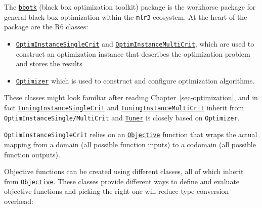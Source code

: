 The
\href{https://bbotk.mlr-org.com}{\texttt{bbotk}}
(black box optimization toolkit) package is the workhorse package for
general black box optimization within the \texttt{mlr3} ecosystem. At
the heart of the package are the R6 classes:

\begin{itemize}
\tightlist
\item
  \href{https://bbotk.mlr-org.com/reference/OptimInstanceSingleCrit.html}{\texttt{OptimInstanceSingleCrit}}
  and
  \href{https://bbotk.mlr-org.com/reference/OptimInstanceMultiCrit.html}{\texttt{OptimInstanceMultiCrit}},
  which are used to construct an optimization
  instance that describes the optimization problem
  and stores the results
\item
  \href{https://bbotk.mlr-org.com/reference/Optimizer.html}{\texttt{Optimizer}}
  which is used to construct and configure optimization algorithms.
\end{itemize}

These classes might look familiar after reading
Chapter~\ref{sec-optimization}, and in fact
\href{https://mlr3tuning.mlr-org.com/reference/TuningInstanceSingleCrit.html}{\texttt{TuningInstanceSingleCrit}}
and
\href{https://mlr3tuning.mlr-org.com/reference/TuningInstanceMultiCrit.html}{\texttt{TuningInstanceMultiCrit}}
inherit from \texttt{OptimInstanceSingle/MultiCrit} and
\href{https://mlr3tuning.mlr-org.com/reference/Tuner.html}{\texttt{Tuner}}
is closely based on \texttt{Optimizer}.

\texttt{OptimInstanceSingleCrit} relies on an
\href{https://bbotk.mlr-org.com/reference/Objective.html}{\texttt{Objective}}
function that wraps the actual mapping from a domain (all possible
function inputs) to a codomain (all possible function outputs).

Objective functions can be created using different classes, all of which
inherit from
\href{https://bbotk.mlr-org.com/reference/Objective.html}{\texttt{Objective}}.
These classes provide different ways to define and evaluate objective
functions and picking the right one will reduce type conversion
overhead:

